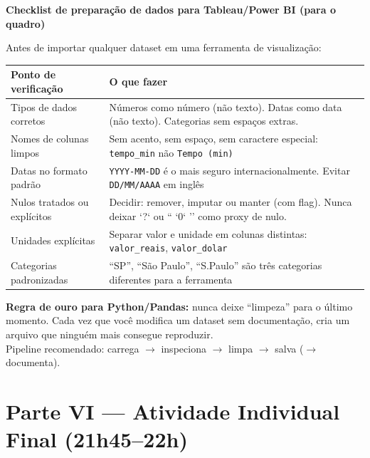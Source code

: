 \begin{BoardBox}
\textbf{Checklist de preparação de dados para Tableau/Power BI (para o quadro)}

Antes de importar qualquer dataset em uma ferramenta de visualização:

\begin{tabular}{|p{4cm}|p{9cm}|}
\hline
\textbf{Ponto de verificação} & \textbf{O que fazer} \\
\hline
Tipos de dados corretos & Números como número (não texto). Datas como data (não texto). Categorias sem espaços extras.\\
Nomes de colunas limpos & Sem acento, sem espaço, sem caractere especial: \texttt{tempo\_min} não \texttt{Tempo (min)} \\
Datas no formato padrão & \texttt{YYYY-MM-DD} é o mais seguro internacionalmente. Evitar \texttt{DD/MM/AAAA} em inglês \\
Nulos tratados ou explícitos & Decidir: remover, imputar ou manter (com flag). Nunca deixar `?` ou `` `0` '' como proxy de nulo. \\
Unidades explícitas & Separar valor e unidade em colunas distintas: \texttt{valor\_reais}, \texttt{valor\_dolar} \\
Categorias padronizadas & ``SP'', ``São Paulo'', ``S.Paulo'' são três categorias diferentes para a ferramenta \\
\hline
\end{tabular}
\end{BoardBox}

\begin{NoteBox}
\textbf{Regra de ouro para Python/Pandas:} nunca deixe ``limpeza'' para o
último momento. Cada vez que você modifica um dataset sem documentação,
cria um arquivo que ninguém mais consegue reproduzir.\\
Pipeline recomendado: carrega $\to$ inspeciona $\to$ limpa $\to$ salva ($\to$ documenta).
\end{NoteBox}

\section{Parte VI — Atividade Individual Final (21h45–22h)}

